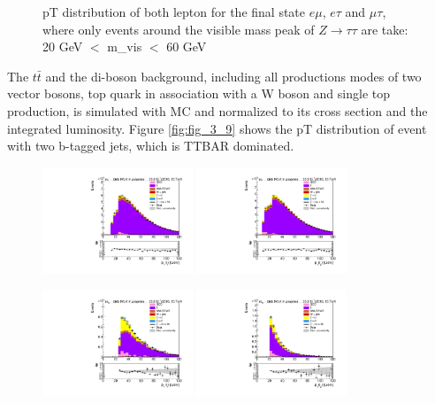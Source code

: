\begin{figure}[htp]
	\caption[\gls{pT} distribution for $Z\to\tau\tau$ control region]{\gls{pT} distribution of both lepton for the final state $e\mu$, $e\tau$ and $\mu\tau$, where only events around the visible mass peak of $Z\to\tau\tau$ are take: 20 GeV $<$ \gls{m_vis} $<$ 60 GeV}
	\label{fig:fig_3_8}
\end{figure}

The $t\bar{t}$ and the di-boson background, including all productions modes of two vector bosons, top quark in association with a W boson and single top production, is simulated with MC and normalized to its cross section and the integrated luminosity. Figure \ref{fig:fig_3_9} shows the \gls{pT} distribution of event with two b-tagged jets, which is \gls{TTBAR} dominated.
\begin{figure}[htp]
	\centering
	\includegraphics[width=0.4\textwidth]{plots/em/TransverseMomentum1_TTBARCR.pdf}
	\includegraphics[width=0.4\textwidth]{plots/em/TransverseMomentum2_TTBARCR.pdf}
	
	\includegraphics[width=0.4\textwidth]{plots/et/TransverseMomentum1_TTBARCR.pdf}
	\includegraphics[width=0.4\textwidth]{plots/et/TransverseMomentum2_TTBARCR.pdf}


\end{figure}
